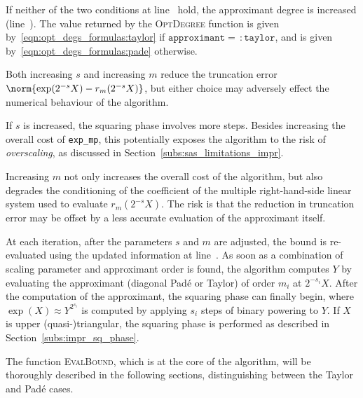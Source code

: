 If neither of the two conditions at line~ hold, the approximant degree is increased (line~). The value returned by the \textsc{OptDegree} function is given by~\eqref{eqn:opt_degs_formulas:taylor} if $\mathtt{approximant}=\,\colon\!\mathtt{taylor}$, and is given by~\eqref{eqn:opt_degs_formulas:pade} otherwise.

\begin{oss*}
	Both increasing $s$ and increasing $m$ reduce the truncation error $\norm{\exp(2^{-s}X)-r_m(2^{-s}X)}$, but either choice may adversely effect the numerical behaviour of the algorithm.
	
	If $s$ is increased, the squaring phase involves more steps. Besides increasing the overall cost of \texttt{exp\_mp}, this potentially exposes the algorithm to the risk of \emph{overscaling}, as discussed in Section~\ref{subs:sas_limitations_impr}.
	
	Increasing $m$ not only increases the overall cost of the algorithm, but also degrades the conditioning of the coefficient of the multiple right-hand-side linear system used to evaluate $r_m(2^{-s}X)$. The risk is that the reduction in truncation error may be offset by a less accurate evaluation of the approximant itself.
\end{oss*}

At each iteration, after the parameters $s$ and $m$ are adjusted, the bound is re-evaluated using the updated information at line~. 
As soon as a combination of scaling parameter and approximant order is found, the algorithm computes $Y$ by evaluating the approximant (diagonal Padé or Taylor) of order $m_i$ at $2^{-s_i}X$. After the computation of the approximant, the squaring phase can finally begin, where $\exp(X)\approx Y^{2^{s_i}}$ is computed by applying $s_i$ steps of binary powering to $Y$. If $X$ is upper (quasi-)triangular, the squaring phase is performed as described in Section~\ref{subs:impr_sq_phase}.

The function \textsc{EvalBound}, which is at the core of the algorithm, will be thoroughly described in the following sections, distinguishing between the Taylor and Padé cases.

